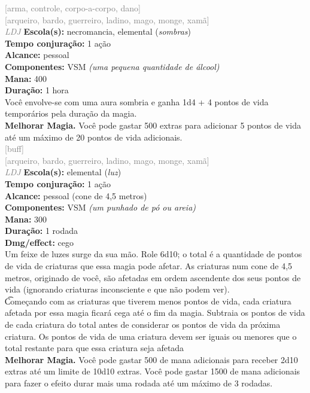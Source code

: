 \documentclass{RPG_Adventure}[2021/10/20]
\begin{document}
{\scriptsize \textcolor{gray}{[arma, controle, corpo-a-corpo, dano]\\}}
{\scriptsize \textcolor{gray}{[arqueiro, bardo, guerreiro, ladino, mago, monge, xamã]\\}}
{\tiny \textcolor{gray}{\textit{LDJ}}}\jump{}
{\small \t \textbf{Escola(s):} necromancia, elemental (\textit{sombras})\\\t \textbf{Tempo conjuração:} 1 ação\\\t \textbf{Alcance:} pessoal\\\t \textbf{Componentes:} VSM \textit{(uma pequena quantidade de álcool)}\\\t \textbf{Mana:} 400\\\t \textbf{Duração:} 1 hora\\}
{\normalsize Você envolve-se com uma aura sombria e ganha 1d4 + 4 pontos de vida temporários pela duração da magia.\\\t \textbf{Melhorar Magia.} Você pode gastar 500 extras para adicionar 5 pontos de vida até um máximo de 20 pontos de vida adicionais.\\}
{\scriptsize \textcolor{gray}{[buff]\\}}
{\scriptsize \textcolor{gray}{[arqueiro, bardo, guerreiro, ladino, mago, monge, xamã]\\}}
{\tiny \textcolor{gray}{\textit{LDJ}}}\jump{}
{\small \t \textbf{Escola(s):} elemental (\textit{luz})\\\t \textbf{Tempo conjuração:} 1 ação\\\t \textbf{Alcance:} pessoal (cone de 4,5 metros)\\\t \textbf{Componentes:} VSM \textit{(um punhado de pó ou areia)}\\\t \textbf{Mana:} 300\\\t \textbf{Duração:} 1 rodada\\\t \textbf{Dmg/effect:} cego\\}
{\normalsize Um feixe de luzes surge da sua mão. Role 6d10; o total é a quantidade de pontos de vida de criaturas que essa magia pode afetar. As criaturas num cone de 4,5 metros, originado de você, são afetadas em ordem ascendente dos seus pontos de vida (ignorando criaturas inconsciente e que não podem ver).\\\t Começando com as criaturas que tiverem menos pontos de vida, cada criatura afetada por essa magia ficará cega até o fim da magia. Subtraia os pontos de vida de cada criatura do total antes de considerar os pontos de vida da próxima criatura. Os pontos de vida de uma criatura devem ser iguais ou menores que o total restante para que essa criatura seja afetada\\\t \textbf{Melhorar Magia.} Você pode gastar 500 de mana adicionais para receber 2d10 extras até um limite de 10d10 extras. Você pode gastar 1500 de mana adicionais para fazer o efeito durar mais uma rodada até um máximo de 3 rodadas.\\}
\end{document}
